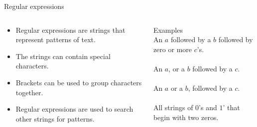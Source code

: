  \begin{frame}{Regular expressions}
  \begin{columns}[T]
    \begin{column}{0.5\textwidth}
      \begin{itemize}
        \setlength\itemsep{5mm}
        \item Regular expressions are strings that represent patterns of text.
        \item The strings can contain special characters.
        \item Brackets can be used to group characters together.
        \item Regular expressions are used to search other strings for patterns.
      \end{itemize}
    \end{column}
    \begin{column}{0.5\textwidth}
      \begin{exampleblock}{Examples}
         \\
        An $a$ followed by a $b$ followed by zero or more $c$'s. \\
         \\
        An $a$, or a $b$ followed by a $c$. \\
         \\
        An $a$ or a $b$, followed by a $c$. \\
        \\
        All strings of $0$'s and $1$' that begin with two zeros.
      \end{exampleblock}
    \end{column}
  \end{columns}
\end{frame}


